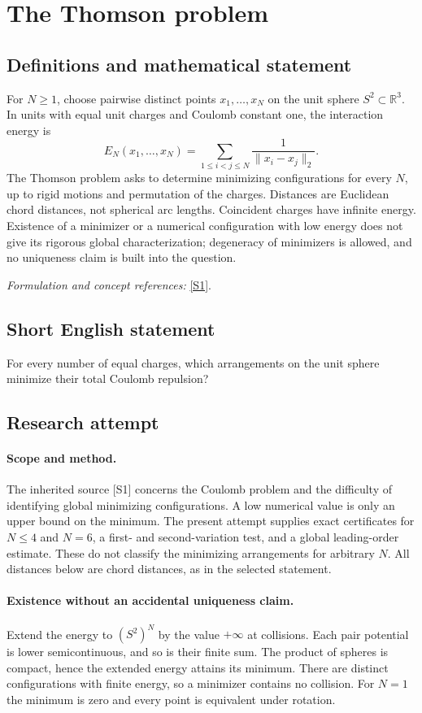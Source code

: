 \documentclass[11pt]{article}
\begin{document}
\section*{\texorpdfstring{The Thomson problem}{The Thomson problem}}\label{statement}
\subsection{Definitions and mathematical statement}
For $N\ge1$, choose pairwise distinct points $x_1,\ldots,x_N$ on the unit sphere $S^2\subset{\mathbb{R}}^3$. In units with equal unit charges and Coulomb constant one, the interaction energy is
\[
 E_N(x_1,\ldots,x_N)=\sum_{1\le i<j\le N}\frac1{\|x_i-x_j\|_2}.
\]
The Thomson problem asks to determine minimizing configurations for every $N$, up to rigid motions and permutation of the charges. Distances are Euclidean chord distances, not spherical arc lengths. Coincident charges have infinite energy. Existence of a minimizer or a numerical configuration with low energy does not give its rigorous global characterization; degeneracy of minimizers is allowed, and no uniqueness claim is built into the question.
\par\smallskip\textit{Formulation and concept references:} \href{https://web.cels.anl.gov/~zippy/publications/thomson/thomsonPRL.html}{[S1]}.

\subsection{Short English statement}
For every number of equal charges, which arrangements on the unit sphere minimize their total Coulomb repulsion?
\subsection{Research attempt}
\paragraph{Scope and method.}
The inherited source [S1] concerns the Coulomb problem and the
difficulty of identifying global minimizing configurations. A low
numerical value is only an upper bound on the minimum. The present
attempt supplies exact certificates for $N\leq4$ and $N=6$, a
first- and second-variation test, and a global leading-order estimate.
These do not classify the minimizing arrangements for arbitrary $N$.
All distances below are chord distances, as in the selected statement.

\paragraph{Existence without an accidental uniqueness claim.}
Extend the energy to $(S^2)^N$ by the value $+\infty$ at collisions.
Each pair potential is lower semicontinuous, and so is their finite
sum. The product of spheres is compact, hence the extended energy
attains its minimum. There are distinct configurations with finite
energy, so a minimizer contains no collision. For $N=1$ the minimum
is zero and every point is equivalent under rotation.
\end{document}
